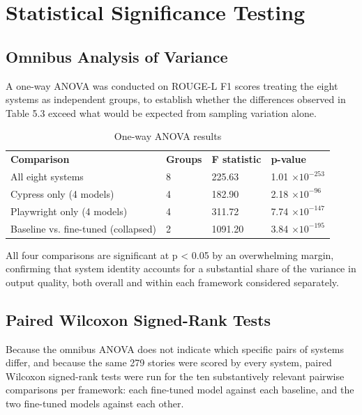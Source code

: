 \section{Statistical Significance Testing}

\subsection{Omnibus Analysis of Variance}

A one-way ANOVA was conducted on ROUGE-L F1 scores treating the eight
systems as independent groups, to establish whether the differences
observed in Table 5.3 exceed what would be expected from sampling
variation alone.

\begin{longtable}[]{@{}llll@{}}
\caption{One-way ANOVA results}\tabularnewline
\toprule
\endhead
\textbf{Comparison} & \textbf{Groups} & \textbf{F statistic} &
\textbf{p-value} \\
All eight systems & 8 & 225.63 & 1.01 $\times 10^{-253}$ \\
Cypress only (4 models) & 4 & 182.90 & 2.18 $\times 10^{-96}$ \\
Playwright only (4 models) & 4 & 311.72 & 7.74 $\times 10^{-147}$ \\
Baseline vs. fine-tuned (collapsed) & 2 & 1091.20 & 3.84 $\times 10^{-195}$ \\
\bottomrule
\end{longtable}

All four comparisons are significant at p \textless{} 0.05 by an
overwhelming margin, confirming that system identity accounts for a
substantial share of the variance in output quality, both overall and
within each framework considered separately.

\subsection{Paired Wilcoxon Signed-Rank Tests}

Because the omnibus ANOVA does not indicate which specific pairs of
systems differ, and because the same 279 stories were scored by every
system, paired Wilcoxon signed-rank tests were run for the ten
substantively relevant pairwise comparisons per framework: each
fine-tuned model against each baseline, and the two fine-tuned models
against each other.

